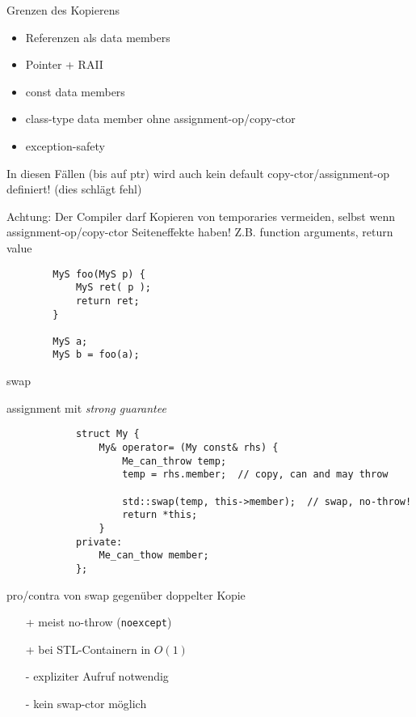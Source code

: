 \begin{frame}[fragile]{Grenzen des Kopierens}
	\begin{itemize}
		\item Referenzen als data members
		\item Pointer + RAII
		\item const data members
		\item class-type data member ohne assignment-op/copy-ctor
		\item exception-safety
	\end{itemize}
	
	In diesen Fällen (bis auf ptr) wird auch kein default copy-ctor/assignment-op definiert! (dies schlägt fehl)
	
	\pause
	
	Achtung: Der Compiler darf Kopieren von temporaries vermeiden, selbst wenn assignment-op/copy-ctor Seiteneffekte haben!
	Z.B. function arguments, return value
	
	\begin{lstlisting}
		MyS foo(MyS p) {
			MyS ret( p );
			return ret;
		}
		
		MyS a;
		MyS b = foo(a);
	\end{lstlisting}
\end{frame}

\begin{frame}[fragile]{swap}
	\begin{block}{ assignment mit \emph{strong guarantee} }
		\begin{lstlisting}
			struct My {
				My& operator= (My const& rhs) {
					Me_can_throw temp;
					temp = rhs.member;	// copy, can and may throw
					
					std::swap(temp, this->member);	// swap, no-throw!
					return *this;
				}
			private:
				Me_can_thow member;
			};
		\end{lstlisting}
	\end{block}
	
	\pause
	
	\begin{block}{pro/contra von swap gegenüber doppelter Kopie}
		\begin{itemize}
			\item[+] meist no-throw (\texttt{noexcept})
			\item[+] bei STL-Containern in $O(1)$
			\item[-] expliziter Aufruf notwendig
			\item[-] kein swap-ctor möglich
		\end{itemize}
	\end{block}
\end{frame}

